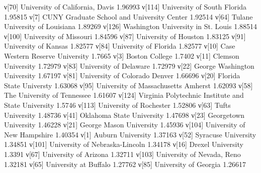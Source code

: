 ν[70]   University of California, Davis                                  1.96993
ν[114]  University of South Florida                                      1.95815
ν[7]    CUNY Graduate School and University Center                       1.92514
ν[64]   Tulane University of Louisiana                                   1.89269
ν[126]  Washington University in St. Louis                               1.88514
ν[100]  University of Missouri                                           1.84596
ν[87]   University of Houston                                            1.83125
ν[91]   University of Kansas                                             1.82577
ν[84]   University of Florida                                            1.82577
ν[10]   Case Western Reserve University                                  1.7665
ν[3]    Boston College                                                   1.7402
ν[11]   Clemson University                                               1.72979
ν[83]   University of Delaware                                           1.72979
ν[22]   George Washington University                                     1.67197
ν[81]   University of Colorado Denver                                    1.66696
ν[20]   Florida State Universty                                          1.63068
ν[95]   University of Massachusetts Amherst                              1.62093
ν[58]   The University of Tennessee                                      1.61607
ν[124]  Virginia Polytechnic Institute and State University              1.5746
ν[113]  University of Rochester                                          1.52806
ν[63]   Tufts University                                                 1.48736
ν[41]   Oklahoma State University                                        1.47698
ν[23]   Georgetown University                                            1.46228
ν[21]   George Mason University                                          1.45936
ν[104]  University of New Hampshire                                      1.40354
ν[1]    Auburn University                                                1.37163
ν[52]   Syracuse University                                              1.34851
ν[101]  University of Nebraska-Lincoln                                   1.34178
ν[16]   Drexel University                                                1.3391
ν[67]   University of Arizona                                            1.32711
ν[103]  University of Nevada, Reno                                       1.32181
ν[65]   University at Buffalo                                            1.27762
ν[85]   University of Georgia                                            1.26617
